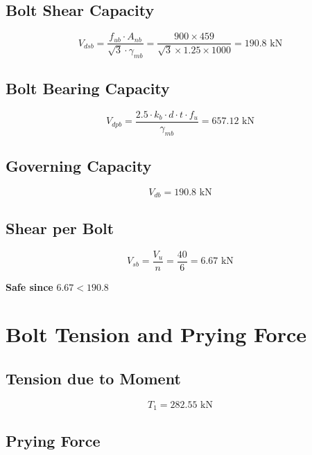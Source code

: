 \subsection{Bolt Shear Capacity}

\begin{equation}
V_{dsb} = \frac{f_{ub} \cdot A_{nb}}{\sqrt{3} \cdot \gamma_{mb}}
= \frac{900 \times 459}{\sqrt{3} \times 1.25 \times 1000}
= 190.8 \text{ kN}
\end{equation}

\subsection{Bolt Bearing Capacity}

\begin{equation}
V_{dpb} = \frac{2.5 \cdot k_b \cdot d \cdot t \cdot f_u}{\gamma_{mb}} = 657.12 \text{ kN}
\end{equation}

\subsection{Governing Capacity}

\begin{equation}
V_{db} = 190.8 \text{ kN}
\end{equation}

\subsection{Shear per Bolt}

\begin{equation}
V_{sb} = \frac{V_u}{n} = \frac{40}{6} = 6.67 \text{ kN}
\end{equation}

\textbf{Safe since } $6.67 < 190.8$

\section{Bolt Tension and Prying Force}

\subsection{Tension due to Moment}

\begin{equation}
T_1 = 282.55 \text{ kN}
\end{equation}

\subsection{Prying Force}

